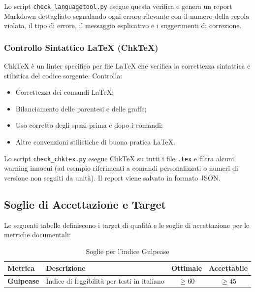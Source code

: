 \documentclass[a4paper,11pt,oneside]{scrartcl}
\begin{document}
Lo script \texttt{check\_languagetool.py} esegue questa verifica e genera un report Markdown dettagliato segnalando ogni errore rilevante con il numero della regola violata, il tipo di errore, il messaggio esplicativo e i suggerimenti di correzione.

\subsubsection{Controllo Sintattico \LaTeX{} (ChkTeX)}

ChkTeX è un linter{\scriptsize{}} specifico per file \LaTeX{} che verifica la correttezza sintattica e stilistica del codice sorgente. Controlla:

\begin{itemize}
    \item Correttezza dei comandi \LaTeX;
    \item Bilanciamento delle parentesi e delle graffe;
    \item Uso corretto degli spazi prima e dopo i comandi;
    \item Altre convenzioni stilistiche di buona pratica \LaTeX.
\end{itemize}

Lo script \texttt{check\_chktex.py} esegue ChkTeX su tutti i file \texttt{.tex} e filtra alcuni warning innocui (ad esempio riferimenti a comandi personalizzati o numeri di versione non seguiti da unità). Il report viene salvato in formato JSON.

\subsection{Soglie di Accettazione e Target}

Le seguenti tabelle definiscono i target di qualità e le soglie di accettazione per le metriche documentali:

\begin{table}[h!]
\centering
\renewcommand{\arraystretch}{1.3}
\begin{tabularx}{\textwidth}{lXcc}
\toprule
\textbf{Metrica} & \textbf{Descrizione} & \textbf{Ottimale} & \textbf{Accettabile} \\
\midrule
\textbf{Gulpease} & Indice di leggibilità per testi in italiano & $\ge 60$ & $\ge 45$ \\
\bottomrule
\end{tabularx}
\caption{Soglie per l'indice Gulpease}
\end{table}
\end{document}
